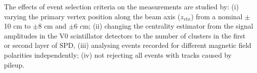 
The effects of event selection criteria on the measurements are studied by:  (i) varying the primary vertex position along the beam axis ($z_{vtx}$) from a nominal $\pm$10 cm to $\pm$8 cm and $\pm$6 cm; (ii) changing the centrality estimator from the signal amplitudes in the V0 scintillator detectors to the number of clusters in the first or second layer of SPD, (iii) analysing events recorded for different magnetic field polarities independently; (iv) not rejecting all events with tracks caused by pileup. 

